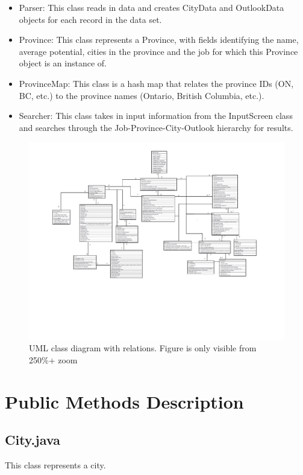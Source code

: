 \documentclass[12pt,fleqn]{article}
\begin{document}
\begin{itemize}
\item Parser: This class reads in data and creates CityData and OutlookData objects for each record in the data set.
\item Province: This class represents a Province, with fields identifying the name, average potential, cities in the province and the job for which this Province object is an instance of.
\item ProvinceMap: This class is a hash map that relates the province IDs (ON, BC, etc.) to the province names (Ontario, British Columbia, etc.).
\item Searcher: This class takes in input information from the InputScreen class and searches through the Job-Province-City-Outlook hierarchy for results.
\end{itemize}


\begin{figure}[hp!]
\caption{UML class diagram with relations. Figure is only visible from 250\%+ zoom}
  \hspace*{-4.4cm}\includegraphics[width = 260mm]{Group04_Classes_Diagram.pdf}
\end{figure}



\newpage
\section*{Public Methods Description}\label{public}
\subsection*{City.java}\label{city}
This class represents a city.
\end{document}
